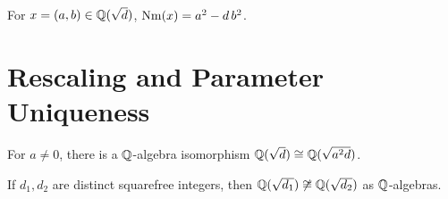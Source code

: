 \begin{lemma}\label{lem:norm_eq_sqr}
  \leanok
  For $x=(a,b)\in\mathbb{Q}(\sqrt{d})$, $\operatorname{Nm}(x) = a^2 - d\,b^2$.
\end{lemma}

\section{Rescaling and Parameter Uniqueness}

\begin{proposition}\label{prop:rescale}
  \leanok
  For $a\ne 0$, there is a $\mathbb{Q}$-algebra isomorphism
  $\mathbb{Q}(\sqrt{d}) \cong \mathbb{Q}(\sqrt{a^2 d})$.
\end{proposition}

\begin{theorem}\label{thm:param_unique}
  \leanok
  If $d_1,d_2$ are distinct squarefree integers, then
  $\mathbb{Q}(\sqrt{d_1}) \not\cong \mathbb{Q}(\sqrt{d_2})$ as $\mathbb{Q}$-algebras.
\end{theorem}
